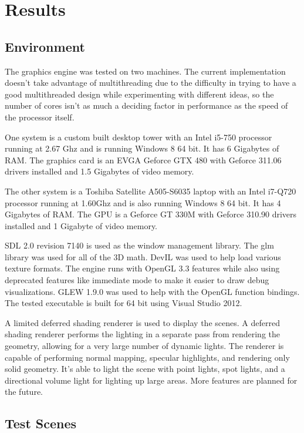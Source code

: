 \documentclass[12pt]{ucthesis}
\begin{document}
\chapter{Results}
\label{results}

\section{Environment}
\label{environment}

The graphics engine was tested on two machines.
The current implementation doesn't take advantage of multithreading due to the difficulty in trying to have a good multithreaded design while experimenting with different ideas, so the number of cores isn't as much a deciding factor in performance as the speed of the processor itself.

One system is a custom built desktop tower with an Intel i5-750 processor running at 2.67 Ghz and is running Windows 8 64 bit.
It has 6 Gigabytes of RAM.
The graphics card is an EVGA Geforce GTX 480 with Geforce 311.06 drivers installed and 1.5 Gigabytes of video memory.

The other system is a Toshiba Satellite A505-S6035 laptop with an Intel i7-Q720 processor running at 1.60Ghz and is also running Windows 8 64 bit.
It has 4 Gigabytes of RAM.
The GPU is a Geforce GT 330M with Geforce 310.90 drivers installed and 1 Gigabyte of video memory.

SDL 2.0 revision 7140 is used as the window management library.
The glm library was used for all of the 3D math.
DevIL was used to help load various texture formats.
The engine runs with OpenGL 3.3 features while also using deprecated features like immediate mode to make it easier to draw debug visualizations.
GLEW 1.9.0 was used to help with the OpenGL function bindings.
The tested executable is built for 64 bit using Visual Studio 2012.

A limited deferred shading renderer is used to display the scenes.
A deferred shading renderer performs the lighting in a separate pass from rendering the geometry, allowing for a very large number of dynamic lights.
The renderer is capable of performing normal mapping, specular highlights, and rendering only solid geometry.
It's able to light the scene with point lights, spot lights, and a directional volume light for lighting up large areas.
More features are planned for the future.

\section{Test Scenes}
\label{test-scenes}
\end{document}
